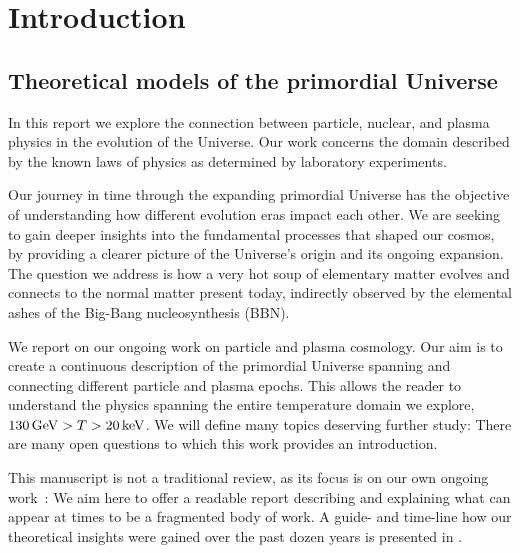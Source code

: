 \maketitle
\setcounter{tocdepth}{3}
\tableofcontents

\section{Introduction}
\subsection{Theoretical models of the primordial Universe}\label{ssec:UniLab}
In this report we explore the connection between particle, nuclear, and plasma physics in the evolution of the Universe. Our work concerns the domain described by the known laws of physics as determined by laboratory experiments.

Our journey in time through the expanding primordial Universe has the objective of understanding how different evolution eras impact each other. We are seeking to gain deeper insights into the fundamental processes that shaped our cosmos, by providing a clearer picture of the Universe's origin and its ongoing expansion. The question we address is how a very hot soup of elementary matter evolves and connects to the normal matter present today, indirectly observed by the elemental ashes of the Big-Bang nucleosynthesis (BBN). 

{\color{black}We report on our  ongoing work on particle and plasma cosmology. Our aim is to create a continuous description of the primordial Universe spanning and connecting different particle and plasma epochs. This allows the reader to understand the physics spanning the entire temperature domain we explore, $130\text{\,GeV}>T>20\,\mathrm{keV}$. We will define many topics deserving further study: There are many open questions to which this work provides an introduction.}

{\color{black}This manuscript is not a traditional review, as its focus is on our own ongoing work~\cite{Rafelski:2023emw,Birrell:2014ona,Grayson:2024okq,Steinmetz:2023ucp,Yang:2024ret}: We aim here to offer a readable report describing and explaining what can appear at times to be a fragmented body of work. A  guide- and time-line how our theoretical insights were gained over the past dozen years is presented in .}

